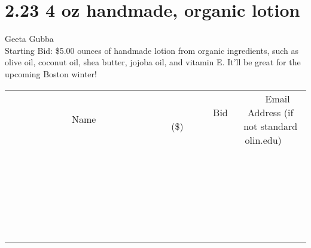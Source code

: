 \documentclass[11pt]{article}
\begin{document}
\section*{2.23 4 oz handmade, organic lotion}
Geeta Gubba
\\
Starting Bid: \$5.00
 ounces of handmade lotion from organic ingredients, such as olive oil, coconut oil, shea butter, jojoba oil, and vitamin E. It'll be great for the upcoming Boston winter!
\\[6ex]
\begin{tabular}{c c c}
~~~~~~~~~~~~~Name~~~~~~~~~~~~~ & ~~~~~~~~~Bid (\$)~~~~~~~~~  & ~~~Email Address (if not standard olin.edu)~~~\\
 & & \\
\hline
 & & \\
\hline
 & & \\
\hline
 & & \\
\hline
 & & \\
\hline
 & & \\
\hline
 & & \\
\hline
 & & \\
\hline
 & & \\
\hline
 & & \\
\hline
 & & \\
\hline
 & & \\
\hline
 & & \\
\hline
 & & \\
\hline
 & & \\
\hline
 & & \\
\hline
 & & \\
\hline
 & & \\
\hline
 & & \\
\hline
 & & \\
\hline
 & & \\
\hline
 & & \\
\hline
 & & \\
\hline
 & & \\
\hline
 & & \\
\hline
 & & \\
\hline
\end{tabular}
\newpage
\end{document}
